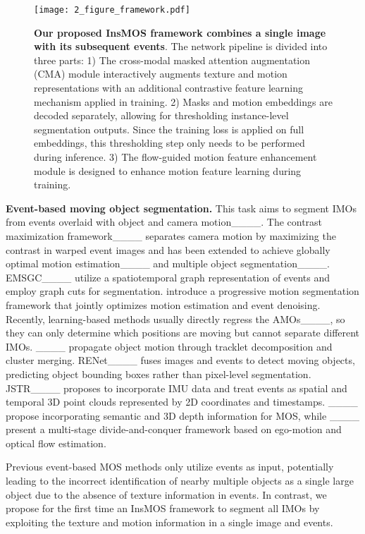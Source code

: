 \begin{figure*}[tbp]
    \centering
    \texttt{[image: 2\_figure\_framework.pdf]}
    \caption{ 
    \textbf{Our proposed InsMOS framework combines a single image with its subsequent events}. 
    The network pipeline is divided into three parts:
    1) The cross-modal masked attention augmentation (CMA) module interactively augments texture and motion representations with an additional contrastive feature learning mechanism applied in training. 
    2) Masks and motion embeddings are decoded separately, allowing for thresholding instance-level segmentation outputs. 
    Since the training loss is applied on full embeddings, this thresholding step only needs to be performed during inference. 
    3) The flow-guided motion feature enhancement module is designed to enhance motion feature learning during training. 
    }  
    \label{fig:framework}
\end{figure*}

\noindent\textbf{Event-based moving object segmentation.} This task aims to segment IMOs from events overlaid with object and camera motion____. 
The contrast maximization framework____ separates camera motion by maximizing the contrast in warped event images and has been extended to achieve globally optimal motion estimation____ and multiple object segmentation____. 
EMSGC____ utilize a spatiotemporal graph representation of events and employ graph cuts for segmentation.
\FixCite{____} introduce a progressive motion segmentation framework that jointly optimizes motion estimation and event denoising. 
Recently, learning-based methods usually directly regress the AMOs____, so they can only determine which positions are moving but cannot separate different IMOs. 
____ propagate object motion through tracklet decomposition and cluster merging. 
RENet____ fuses images and events to detect moving objects, predicting object bounding boxes rather than pixel-level segmentation. 
JSTR____ proposes to incorporate IMU data and treat events as spatial and temporal 3D point clouds represented by 2D coordinates and timestamps. 
____ propose incorporating semantic and 3D depth information for MOS, while ____ present a multi-stage divide-and-conquer framework based on ego-motion and optical flow estimation. 



Previous event-based MOS methods only utilize events as input, potentially leading to the incorrect identification of nearby multiple objects as a single large object due to the absence of texture information in events.
In contrast, we propose for the first time an InsMOS framework to segment all IMOs by exploiting the texture and motion information in a single image and events.
